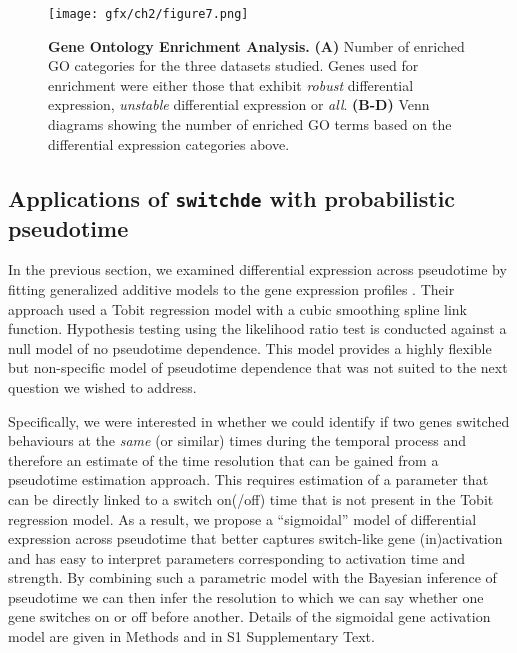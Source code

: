 \begin{figure}
\centering
	\texttt{[image: gfx/ch2/figure7.png]}
\caption{ {\bf Gene Ontology Enrichment Analysis.}
\textbf{(A)} Number of enriched GO categories for the three datasets studied. Genes used for enrichment were either those that exhibit \emph{robust} differential expression, \emph{unstable} differential expression or \emph{all}.
\textbf{(B-D)} Venn diagrams showing the number of enriched GO terms based on the differential expression categories above.} \label{fig:go_enrichment}
\end{figure}


\subsection{Applications of \texttt{switchde} with probabilistic pseudotime}

In the previous section, we examined differential expression across pseudotime by fitting generalized additive models to the gene expression profiles \cite{Trapnell2014}. Their approach used a Tobit regression model with a cubic smoothing spline link function. Hypothesis testing using the likelihood ratio test is conducted against a null model of no pseudotime dependence. This model provides a highly flexible but non-specific model of pseudotime dependence that was not suited to the next question we wished to address.

Specifically, we were interested in whether we could identify if two genes switched behaviours at the \emph{same} (or similar) times during the temporal process and therefore an estimate of the time resolution that can be gained from a pseudotime estimation approach. This requires estimation of a parameter that can be directly linked to a switch on(/off) time that is not present in the Tobit regression model. As a result, we propose a ``sigmoidal'' model of differential expression across pseudotime that better captures switch-like gene (in)activation and has easy to interpret parameters corresponding to activation time and strength. By combining such a parametric model with the Bayesian inference of pseudotime we can then infer the resolution to which we can say whether one gene switches on or off before another. Details of the sigmoidal gene activation model are given in Methods and in S1 Supplementary Text.

